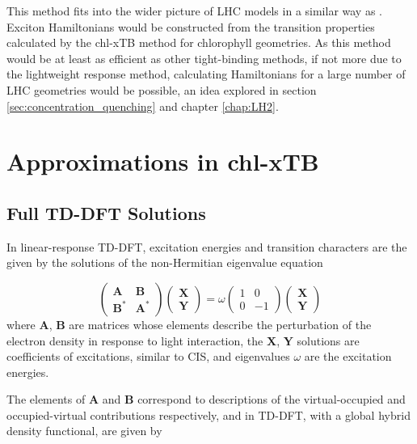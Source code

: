 This method fits into the wider picture of LHC models in a similar way as \dscf.
Exciton Hamiltonians would be constructed from the transition properties calculated
by the chl-xTB method for chlorophyll geometries. As this method would be at least 
as efficient as other tight-binding methods, if not more due to the lightweight
response method, calculating Hamiltonians for a large number of LHC geometries would
be possible, an idea explored in section \ref{sec:concentration_quenching} and chapter \ref{chap:LH2}.

\section{Approximations in chl-xTB}
\label{sec:theory}

\subsection{Full TD-DFT Solutions}
\label{subsec:tddft_equation}
In linear-response TD-DFT, excitation energies and transition characters are the
given by the solutions of the non-Hermitian eigenvalue equation

\begin{equation}
    \begin{pmatrix}
        \mathbf{A}   & \mathbf{B} \\
        \mathbf{B}^\ast  & \mathbf{A}^\ast
    \end{pmatrix}
    \begin{pmatrix}
        \mathbf{X} \\
        \mathbf{Y}
    \end{pmatrix}
    = 
    \omega
    \begin{pmatrix}
        1 & 0 \\
        0 & -1
    \end{pmatrix}
    \begin{pmatrix}
        \mathbf{X} \\
        \mathbf{Y}
    \end{pmatrix}
\end{equation}
%
where $\mathbf{A}$, $\mathbf{B}$ are matrices whose elements describe the perturbation
of the electron density in response to light interaction, the $\mathbf{X}$, $\mathbf{Y}$
solutions are coefficients of excitations, similar to CIS, and eigenvalues $\omega$
are the excitation energies.

The elements of $\mathbf{A}$ and $\mathbf{B}$ correspond to descriptions of the
virtual-occupied and occupied-virtual contributions respectively, and in TD-DFT, 
with a global hybrid density functional, are given by

